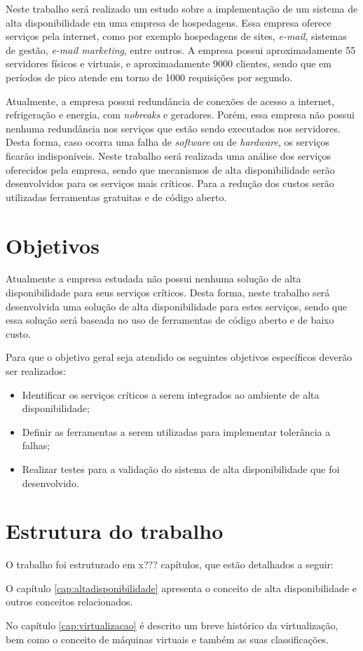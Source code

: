 Neste trabalho será realizado um estudo sobre a implementação de um sistema de alta disponibilidade em uma empresa de hospedagens. 
Essa empresa oferece serviços pela internet, como por exemplo hospedagens de sites, \textit{e-mail}, sistemas de gestão, \textit{e-mail marketing}, 
entre outros. A empresa possui aproximadamente 55 servidores físicos e virtuais, e aproximadamente 9000 clientes, 
sendo que em períodos de pico atende em torno de 1000 requisições por segundo. 

Atualmente, a empresa possui redundância de conexões de acesso a internet, refrigeração e energia, com \textit{nobreaks} e geradores. 
Porém, essa empresa não possui nenhuma redundância nos serviços que estão sendo executados nos servidores. Desta forma, 
caso ocorra uma falha de \textit{software} ou de \textit{hardware}, os serviços ficarão indisponíveis. Neste trabalho será realizada uma análise dos serviços 
oferecidos pela empresa, sendo que mecanismos de alta disponibilidade serão desenvolvidos para os serviços mais críticos. 
Para a redução dos custos serão utilizadas ferramentas gratuitas e de código aberto.

\section{Objetivos}
Atualmente a empresa estudada não possui nenhuma solução de alta disponibilidade para seus serviços críticos. 
Desta forma, neste trabalho será desenvolvida uma solução de alta disponibilidade para estes serviços, 
sendo que essa solução será baseada no uso de ferramentas de código aberto e de baixo custo.

Para que o objetivo geral seja atendido os seguintes objetivos específicos deverão ser realizados:

\begin{itemize}
\item Identificar os serviços críticos a serem integrados ao ambiente de alta disponibilidade;
\item Definir as ferramentas a serem utilizadas para implementar tolerância a falhas;
\item Realizar testes para a validação do sistema de alta disponibilidade que foi desenvolvido.
\end{itemize}

\section{Estrutura do trabalho}
O trabalho foi estruturado em x??? capítulos, que estão detalhados a seguir:

O capítulo \ref{cap:altadisponibilidade} apresenta o conceito de alta disponibilidade e outros conceitos relacionados.

No capítulo \ref{cap:virtualizacao} é descrito um breve histórico da virtualização, bem como o conceito de máquinas virtuais e
também as suas classificações.
